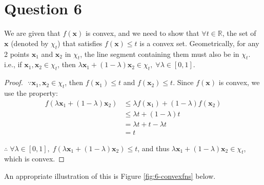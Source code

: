 \documentclass[12pt]{article}
\begin{document}
\newpage 

\section*{Question 6}
We are given that $f(\mathbf{x})$ is convex, and we need to show that $\forall t \in \mathbb{R}$, the set of $\mathbf{x}$ (denoted by $\chi_t$) that satisfies $f(\mathbf{x}) \leq t$ is a convex set. Geometrically, for any 2 points $\mathbf{x}_1$ and $\mathbf{x}_2$ in $\chi_t$, the line segment containing them must also be in $\chi_t$. i.e., if $\mathbf{x}_1, \mathbf{x}_2 \in \chi_t$, then $\lambda \mathbf{x}_1 + (1-\lambda)\mathbf{x}_2 \in \chi_t, \; \forall \lambda \in [0,1]$. \\ 

\begin{proof}
    $ $ \newline $\because \mathbf{x}_1, \mathbf{x}_2 \in \chi_t$, then $f(\mathbf{x}_1) \leq t$ and $f(\mathbf{x}_2) \leq t$. Since $f(\mathbf{x})$ is convex, we use the property: \\ 
    \begin{align*}
        f(\lambda \mathbf{x}_1 + (1-\lambda) \mathbf{x}_2) & \leq \lambda f(\mathbf{x}_1) + (1-\lambda) f(\mathbf{x}_2) \\ 
        & \leq \lambda t + (1- \lambda) t \\ 
        &= \lambda t + t - \lambda t \\ 
        &= t
    \end{align*}

    \noindent $\therefore \; \forall \lambda \in [0,1], \; f(\lambda \mathbf{x}_1 + (1-\lambda) \mathbf{x}_2) \leq t$, and thus $\lambda \mathbf{x}_1 + (1-\lambda) \mathbf{x}_2 \in \chi_t$, which is convex.  
\end{proof}


\noindent An appropriate illustration of this is Figure \ref{fig:6-convexfns} below. 
\end{document}
